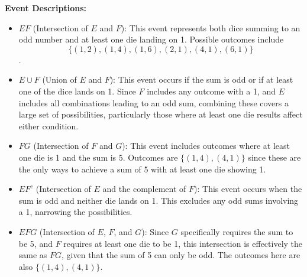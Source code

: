         \begin{solution}
        \textbf{Event Descriptions:}
        \begin{itemize}
            \item \(EF\) (Intersection of \(E\) and \(F\)): This event represents both dice summing to an odd number and at least one die landing on 1. Possible outcomes include \[\{(1, 2), (1, 4), (1, 6), (2, 1), (4, 1), (6, 1)\}\].
        
            \item \(E \cup F\) (Union of \(E\) and \(F\)): This event occurs if the sum is odd or if at least one of the dice lands on 1. Since \(F\) includes any outcome with a 1, and \(E\) includes all combinations leading to an odd sum, combining these covers a large set of possibilities, particularly those where at least one die results affect either condition.
        
            \item \(FG\) (Intersection of \(F\) and \(G\)): This event includes outcomes where at least one die is 1 and the sum is 5. Outcomes are \(\{(1, 4), (4, 1)\}\) since these are the only ways to achieve a sum of 5 with at least one die showing 1.
        
            \item \(EF^c\) (Intersection of \(E\) and the complement of \(F\)): This event occurs when the sum is odd and neither die lands on 1. This excludes any odd sums involving a 1, narrowing the possibilities.
        
            \item \(EFG\) (Intersection of \(E\), \(F\), and \(G\)): Since \(G\) specifically requires the sum to be 5, and \(F\) requires at least one die to be 1, this intersection is effectively the same as \(FG\), given that the sum of 5 can only be odd. The outcomes here are also \(\{(1, 4), (4, 1)\}\).
        \end{itemize}
        \end{solution}

